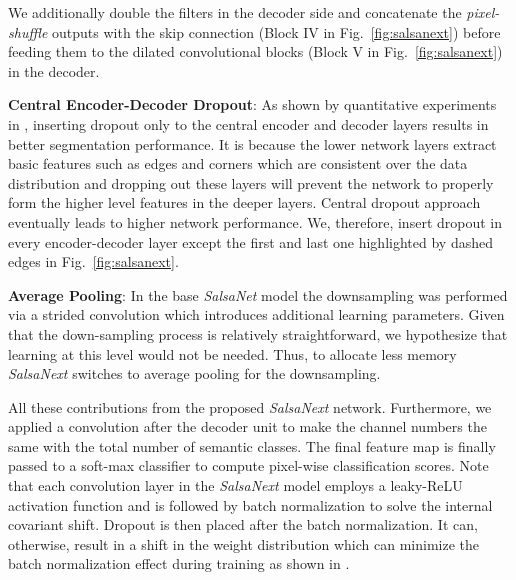 \documentclass[letterpaper, 10 pt, conference]{ieeeconf}
\newcommand{\snx}[1]{\textit{SalsaNext }{#1}}
\newcommand{\sn}[1]{\textit{SalsaNet }{#1}}
\begin{document}
We additionally double the filters in the decoder side and concatenate the \textit{pixel-shuffle} outputs with the skip connection (Block IV in Fig.~\ref{fig:salsanext}) before feeding them to the dilated convolutional blocks (Block V in Fig.~\ref{fig:salsanext}) in the decoder.



\textbf{Central Encoder-Decoder Dropout}:
As shown by quantitative  experiments in \cite{kendall2015bayesian}, inserting dropout  only to the  central encoder and decoder layers results in better segmentation performance. It is because the lower network layers extract   basic features such as edges and corners \cite{ZeilerF13} which are consistent over the data distribution and dropping out these layers will prevent the network to properly form the higher level features in the deeper layers. Central dropout approach eventually leads to higher network performance.
We, therefore, insert dropout in every encoder-decoder layer except the first and last one highlighted by dashed edges in Fig.~\ref{fig:salsanext}.





\textbf{Average Pooling}:
In the base \sn model the downsampling was performed via a strided convolution which introduces additional learning parameters. 
Given that the down-sampling process is relatively straightforward, we hypothesize that learning at this level would not be needed. Thus, to allocate less memory \snx switches to average pooling for the downsampling.



















 

All these  contributions from the proposed \snx network. Furthermore,  we applied a  convolution   after the decoder unit   to make the channel numbers the same with the total number of semantic classes. The final feature map is finally passed to a soft-max classifier to compute pixel-wise classification scores. 
Note that each convolution layer in the  \snx model employs a leaky-ReLU activation function and is followed by batch normalization to solve the internal covariant shift.    
Dropout is then placed after the batch normalization. It can, otherwise, result in a shift in the weight distribution which can minimize the batch normalization effect during training as  shown in \cite{li2018understanding}. 
\end{document}
